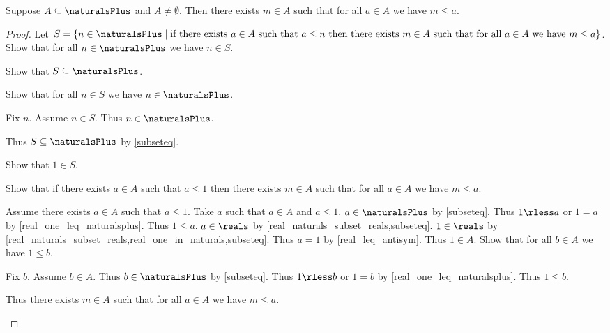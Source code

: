 \begin{theorem}\label{real_naturals_least_element}
    Suppose $A\subseteq\naturalsPlus$ and $A\neq \emptyset$.
    Then there exists $m\in A$ such that for all $a\in A$ we have $m \leq a$.
\end{theorem}
\begin{proof}
    Let $S = \{ n\in\naturalsPlus \mid \text{if there exists $a\in A$ such that $a \leq n$ then there exists $m\in A$ such that for all $a\in A$ we have $m \leq a$}\}$.
    Show that for all $n\in\naturalsPlus$ we have $n\in S$.
    \begin{subproof}
        Show that $S\subseteq\naturalsPlus$.
        \begin{subproof}
            Show that for all $n\in S$ we have $n\in\naturalsPlus$.
            \begin{subproof}
                Fix $n$.
                Assume $n\in S$.
                Thus $n\in\naturalsPlus$.
            \end{subproof}
            Thus $S\subseteq\naturalsPlus$ by \cref{subseteq}.
        \end{subproof}
        Show that $1\in S$.
        \begin{subproof}
            Show that if there exists $a\in A$ such that $a \leq 1$ then there exists $m\in A$ such that for all $a\in A$ we have $m \leq a$.
            \begin{subproof}
                Assume there exists $a\in A$ such that $a \leq 1$.
                Take $a$ such that $a\in A$ and $a \leq 1$.
                $a\in\naturalsPlus$ by \cref{subseteq}.
                Thus $1 \rless a$ or $1 = a$ by \cref{real_one_leq_naturalsplus}.
                Thus $1 \leq a$.
                $a\in\reals$ by \cref{real_naturals_subset_reals,subseteq}.
                $1\in\reals$ by \cref{real_naturals_subset_reals,real_one_in_naturals,subseteq}.
                Thus $a = 1$ by \cref{real_leq_antisym}.
                Thus $1\in A$.
                Show that for all $b\in A$ we have $1 \leq b$.
                \begin{subproof}
                    Fix $b$.
                    Assume $b\in A$.
                    Thus $b\in\naturalsPlus$ by \cref{subseteq}.
                    Thus $1 \rless b$ or $1 = b$ by \cref{real_one_leq_naturalsplus}.
                    Thus $1 \leq b$.
                \end{subproof}
                Thus there exists $m\in A$ such that for all $a\in A$ we have $m \leq a$.
            \end{subproof}

\end{subproof}
\end{subproof}
\end{proof}

